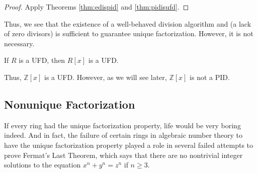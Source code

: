 \documentclass[english,course]{lecture}
\renewcommand{\ge}{\geqslant}
\newenvironment{facnote}{\startfacnote}{}
\def\startfacnote#1\end{\margintext{{\sc Note:} #1}\end}
\newenvironment{hint}{\startimportant}{}
\def\startimportant#1\end{[{Hint:} #1]\end}
\theoremstyle{plain}
\def\Z{{\mathbb Z}}
\def\presnotes{}
\begin{document}
\begin{proof}
	Apply Theorems \ref{thm:edispid} and \ref{thm:pidisufd}.
\end{proof}

\presnotes



\presnotes

Thus, we see that the existence of a well-behaved division algorithm and (a lack of zero divisors) is sufficient to guarantee unique factorization.
However, it is not necessary. 


\begin{unnumberedtheorem}
	If $R$ is a UFD, then $R[x]$ is a UFD.
\end{unnumberedtheorem}

Thus, $\Z[x]$ is a UFD.
However, as we will see later, $\Z[x]$ is not a PID.









\subsection{Nonunique Factorization}\label{SubSec-Nonunique-Factorization}


If every ring had the unique factorization property, life would be very boring indeed.
And in fact, the failure of certain rings in algebraic number theory to have the unique factorization property played a role in several failed attempts to prove Fermat's Last Theorem, which says that there are no nontrivial integer solutions to the equation $x^n + y^n = z^n$ if $n \ge 3$.
\end{document}
